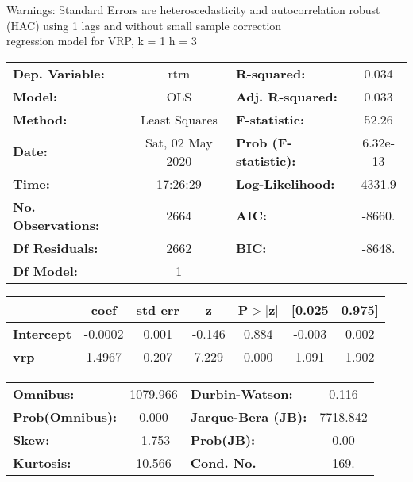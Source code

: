 Warnings: \newline
 [1] Standard Errors are heteroscedasticity and autocorrelation robust (HAC) using 1 lags and without small sample correction\\ 

regression model for VRP, k = 1 h = 3\begin{center}
\begin{tabular}{lclc}
\toprule
\textbf{Dep. Variable:}    &       rtrn       & \textbf{  R-squared:         } &     0.034   \\
\textbf{Model:}            &       OLS        & \textbf{  Adj. R-squared:    } &     0.033   \\
\textbf{Method:}           &  Least Squares   & \textbf{  F-statistic:       } &     52.26   \\
\textbf{Date:}             & Sat, 02 May 2020 & \textbf{  Prob (F-statistic):} &  6.32e-13   \\
\textbf{Time:}             &     17:26:29     & \textbf{  Log-Likelihood:    } &    4331.9   \\
\textbf{No. Observations:} &        2664      & \textbf{  AIC:               } &    -8660.   \\
\textbf{Df Residuals:}     &        2662      & \textbf{  BIC:               } &    -8648.   \\
\textbf{Df Model:}         &           1      & \textbf{                     } &             \\
\bottomrule
\end{tabular}
\begin{tabular}{lcccccc}
                   & \textbf{coef} & \textbf{std err} & \textbf{z} & \textbf{P$> |$z$|$} & \textbf{[0.025} & \textbf{0.975]}  \\
\midrule
\textbf{Intercept} &      -0.0002  &        0.001     &    -0.146  &         0.884        &       -0.003    &        0.002     \\
\textbf{vrp}       &       1.4967  &        0.207     &     7.229  &         0.000        &        1.091    &        1.902     \\
\bottomrule
\end{tabular}
\begin{tabular}{lclc}
\textbf{Omnibus:}       & 1079.966 & \textbf{  Durbin-Watson:     } &    0.116  \\
\textbf{Prob(Omnibus):} &   0.000  & \textbf{  Jarque-Bera (JB):  } & 7718.842  \\
\textbf{Skew:}          &  -1.753  & \textbf{  Prob(JB):          } &     0.00  \\
\textbf{Kurtosis:}      &  10.566  & \textbf{  Cond. No.          } &     169.  \\
\bottomrule
\end{tabular}
\end{center}

